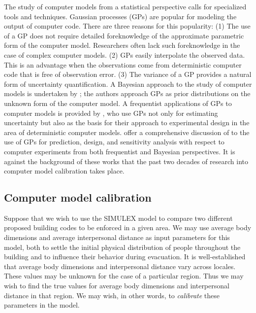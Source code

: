 \documentclass{article}
\begin{document}
The study of computer models from a statistical perspective calls for specialized tools and techniques. Gaussian processes (GPs) are popular for modeling the output of computer code. There are three reasons for this popularity: (1) The use of a GP does not require detailed foreknowledge of the approximate parametric form of the computer model. Researchers often lack such foreknowledge in the case of complex computer models. (2) GPs easily interpolate the observed data. This is an advantage when the observations come from deterministic computer code that is free of observation error. (3) The variance of a GP provides a natural form of uncertainty quantification. 
A Bayesian approach to the study of computer models is undertaken by \cite{Currin1991}; the authors approach GPs as prior distributions on the unknown form of the computer model. A frequentist applications of GPs to computer models is provided by \cite{Sacks1989}, who use GPs not only for estimating uncertainty but also as the basis for their approach to experimental design in the area of deterministic computer models.  \cite{Santner2003a} offer a comprehensive discussion of to the use of GPs for prediction, design, and sensitivity analysis with respect to computer experiments from both frequentist and Bayesian perspectives. It is against the background of these works that the past two decades of research into computer model calibration takes place.

\subsection{Computer model calibration} \label{computer_model_calibration}

Suppose that we wish to use the SIMULEX model to compare two different proposed building codes to be enforced in a given area. We may use average body dimensions and average interpersonal distance as input parameters for this model, both to settle the initial physical distribution of people throughout the building and to influence their behavior during evacuation. It is well-established that average body dimensions \citep{Subramanian2011,Cavelaars2000} %
and interpersonal distance \citep{Sorokowska2017} vary across locales. These values may be unknown for the case of a particular region. Thus we may wish to find the true values for average body dimensions and interpersonal distance in that region. We may wish, in other words, to \textit{calibrate} these parameters in the model.
\end{document}
